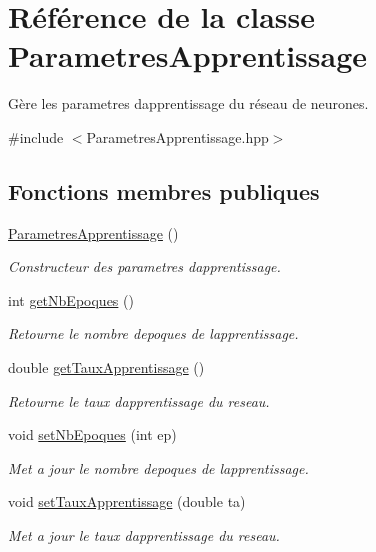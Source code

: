 \hypertarget{class_parametres_apprentissage}{}\section{Référence de la classe Parametres\+Apprentissage}
\label{class_parametres_apprentissage}


Gère les parametres d\textquotesingle{}apprentissage du réseau de neurones.  




{\ttfamily \#include $<$Parametres\+Apprentissage.\+hpp$>$}

\subsection*{Fonctions membres publiques}
\begin{DoxyCompactItemize}
\item 
\mbox{\label{class_parametres_apprentissage_a0912bbe1ac8b0f2e0248edf049ef0b53}} 
\hyperlink{class_parametres_apprentissage_a0912bbe1ac8b0f2e0248edf049ef0b53}{Parametres\+Apprentissage} ()
\begin{DoxyCompactList}\small\item\em Constructeur des parametres d\textquotesingle{}apprentissage. \end{DoxyCompactList}\item 
int \hyperlink{class_parametres_apprentissage_ad4342b1543901201ad28b1da5c11dc26}{get\+Nb\+Epoques} ()
\begin{DoxyCompactList}\small\item\em Retourne le nombre d\textquotesingle{}epoques de l\textquotesingle{}apprentissage. \end{DoxyCompactList}\item 
double \hyperlink{class_parametres_apprentissage_aa5b6d225498ee1270996ace135745fdd}{get\+Taux\+Apprentissage} ()
\begin{DoxyCompactList}\small\item\em Retourne le taux d\textquotesingle{}apprentissage du reseau. \end{DoxyCompactList}\item 
void \hyperlink{class_parametres_apprentissage_a0b424fc552461e9e13d51024bd071470}{set\+Nb\+Epoques} (int ep)
\begin{DoxyCompactList}\small\item\em Met a jour le nombre d\textquotesingle{}epoques de l\textquotesingle{}apprentissage. \end{DoxyCompactList}\item 
void \hyperlink{class_parametres_apprentissage_a13b6b90a24b4733c6b465aa74a1abda9}{set\+Taux\+Apprentissage} (double ta)
\begin{DoxyCompactList}\small\item\em Met a jour le taux d\textquotesingle{}apprentissage du reseau. \end{DoxyCompactList}\end{DoxyCompactItemize}


